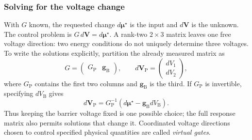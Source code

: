 \subsubsection{Solving for the voltage change}
With $G$ known, the requested change $d\boldsymbol\mu^\star$ is the
input and $d\mathbf V$ is the unknown. The control problem is
$G\,d\mathbf V=d\boldsymbol\mu^\star$.
A rank-two $2\times3$ matrix leaves one free voltage direction:
two energy conditions do not uniquely determine three voltages.
To write the solutions explicitly, partition the already measured
matrix as
\[
 G=\begin{pmatrix}G_{\mathrm P}&\mathbf g_{\mathrm B}\end{pmatrix},
 \qquad
 d\mathbf V_{\mathrm P}=\begin{pmatrix}dV_1\\dV_2\end{pmatrix},
\]
where $G_{\mathrm P}$ contains the first two columns and
$\mathbf g_{\mathrm B}$ is the third. If $G_{\mathrm P}$ is
invertible, specifying $dV_{\mathrm B}$ gives
\begin{equation}
 d\mathbf V_{\mathrm P}
 =G_{\mathrm P}^{-1}
       \left(d\boldsymbol\mu^\star-\mathbf g_{\mathrm B}dV_{\mathrm B}\right).
 \label{eq:calibration-virtual-gates}
\end{equation}
Thus keeping the barrier voltage fixed is one possible choice;
the full response matrix also permits solutions that change it.
Coordinated voltage directions chosen to control specified
physical quantities are called \emph{virtual gates}.

